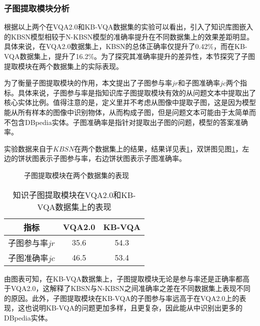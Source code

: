 \subsubsection{子图提取模块分析}
根据以上两个在VQA2.0和KB-VQA数据集的实验可以看出，引入了知识库图嵌入的KBSN模型相较于N-KBSN模型的准确率提升在不同数据集上的效果差距明显。具体来说，在VQA2.0数据集上，KBSN的总体正确率仅提升了0.42\%，而在KB-VQA数据集上，提升了16.2\%。为了探究其准确率提升的差异性，本节探究了子图提取模块在两个数据集上的实际表现。

为了衡量子图提取模块的作用，本文提出了子图参与率$jr$和子图准确率$jc$两个指标。具体来说，子图参与率是指知识库子图提取模块有效的从问题文本中提取出了核心实体比例。值得注意的是，定义里并不考虑从图像中提取子图，这是因为模型能从所有样本的图像中识别物体，从而构成子图，但是问题文本可能由于太简单而不包含DBpedia实体。子图准确率是指针对提取出子图的问题，模型的答案准确率。


实验数据来自于$KBSN$在两个数据集上的结果，结果详见表\ref{kbsn_compr}，双饼图见图\ref{kbsn_graph}，左边的饼状图表示子图参与率，右边饼状图表示子图准确率。
\begin{figure}[H]
	\centering
	\caption{子图提取模块在两个数据集的表现}
	\label{kbsn_graph}
\end{figure}
\begin{table}[H]
\centering
\caption{知识子图提取模块在VQA2.0和KB-VQA数据集上的表现}
\begin{tabular}{ccc}
\toprule
指标 & VQA2.0 & KB-VQA \\
\midrule
子图参与率$jr$&  35.6& 54.3 \\
子图准确率$jc$&  46.5& 53.4 \\
\bottomrule
\end{tabular}
\label{kbsn_compr}
\end{table}

由图表可知，在KB-VQA数据集上，子图提取模块无论是参与率还是正确率都高于VQA2.0，这解释了KBSN与N-KBSN之间准确率之差在不同数据集上表现不同的原因。此外，子图提取模块在KB-VQA的子图参与率远高于在VQA2.0上的表现，这也说明KB-VQA的问题更加多样，且更复杂，因此能从中识别出更多的DBpedia实体。

